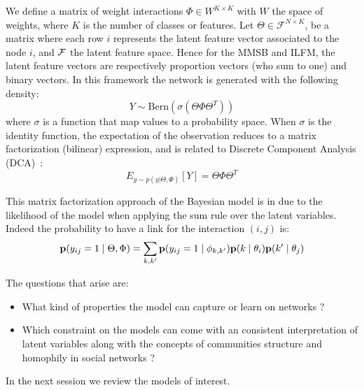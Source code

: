 We define a matrix of weight interactions $\Phi \in W^{K\times K}$ with $W$ the space of weights, where $K$ is the number of classes or features. Let $\Theta \in \mathcal{F}^{N\times K}$, be a matrix where each row $i$ represents the latent feature vector associated to the node $i$,  and $\cal{F}$ the latent feature space. Hence for the MMSB and ILFM, the latent feature vectors are respectively proportion vectors (who sum to one) and binary vectors. In this framework the network is generated with the following density:
\begin{equation} \label{MFDCA}
    Y \sim \mathrm{Bern}(\sigma(\Theta \Phi  \Theta^T))
\end{equation}
where $\sigma$ is a function that map values to a probability space. When $\sigma$ is the identity function, the expectation of the observation reduces to a matrix factorization (bilinear) expression, and is related to Discrete Component Analysis (DCA)~\cite{DCA}:
\begin{equation}
E_{y \sim p(y|\Theta, \Phi)}[Y] = \Theta \Phi  \Theta^T
\end{equation}

This matrix factorization approach of the Bayesian model is in due to the likelihood of the model when applying the sum rule over the latent variables. Indeed the probability to have a link for the interaction $(i,j)$ is:
\begin{equation}
\mathbf{p}(y_{ij}=1 \mid \Theta, \Phi ) = \sum_{k, k'} \mathbf{p}(y_{ij}=1\mid\phi_{k,k'}) \mathbf{p}(k \mid\theta_i) \mathbf{p}(k' \mid \theta_j)
\end{equation}


The questions that arise are:
\begin{itemize}
	\item What kind of properties the model can capture or learn on networks ?
	\item Which constraint on the models can come with an consistent interpretation of latent variables along with the concepts of communities structure and homophily in social networks  ?
\end{itemize} 

In the next session we review the models of interest.

